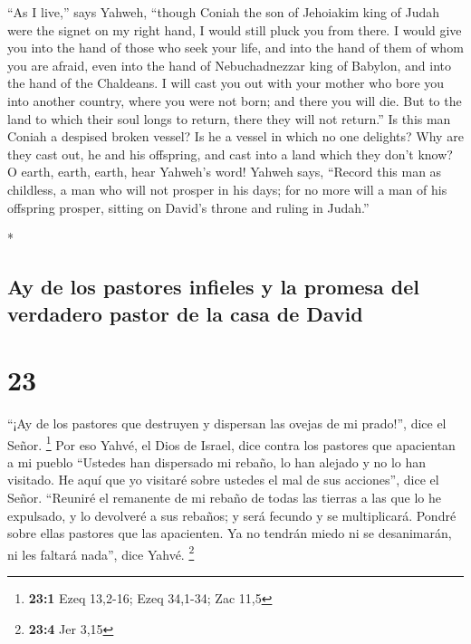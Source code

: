 \begin{paracol}{2}
\begin{otherlanguage}{english}
 ``As I live,'' says Yahweh, ``though Coniah the son of
Jehoiakim king of Judah were the signet on my right hand, I would still
pluck you from there.  I would give you into the hand of
those who seek your life, and into the hand of them of whom you are
afraid, even into the hand of Nebuchadnezzar king of Babylon, and into
the hand of the Chaldeans.  I will cast you out with your
mother who bore you into another country, where you were not born; and
there you will die.  But to the land to which their soul
longs to return, there they will not return.''  Is this
man Coniah a despised broken vessel? Is he a vessel in which no one
delights? Why are they cast out, he and his offspring, and cast into a
land which they don't know?  O earth, earth, earth, hear
Yahweh's word!  Yahweh says, ``Record this man as
childless, a man who will not prosper in his days; for no more will a
man of his offspring prosper, sitting on David's throne and ruling in
Judah.''

\end{otherlanguage}

\switchcolumn[0]*

\hypertarget{ay-de-los-pastores-infieles-y-la-promesa-del-verdadero-pastor-de-la-casa-de-david}{%
\subsection{Ay de los pastores infieles y la promesa del verdadero
pastor de la casa de
David}\label{ay-de-los-pastores-infieles-y-la-promesa-del-verdadero-pastor-de-la-casa-de-david}}

\hypertarget{section-44}{%
\section{23}\label{section-44}}

 ``¡Ay de los pastores que destruyen y dispersan las
ovejas de mi prado!'', dice el Señor. \footnote{\textbf{23:1} Ezeq
  13,2-16; Ezeq 34,1-34; Zac 11,5}  Por eso Yahvé, el Dios
de Israel, dice contra los pastores que apacientan a mi pueblo ``Ustedes
han dispersado mi rebaño, lo han alejado y no lo han visitado. He aquí
que yo visitaré sobre ustedes el mal de sus acciones'', dice el Señor.
 ``Reuniré el remanente de mi rebaño de todas las tierras
a las que lo he expulsado, y lo devolveré a sus rebaños; y será fecundo
y se multiplicará.  Pondré sobre ellas pastores que las
apacienten. Ya no tendrán miedo ni se desanimarán, ni les faltará
nada'', dice Yahvé. \footnote{\textbf{23:4} Jer 3,15}


\end{paracol}
